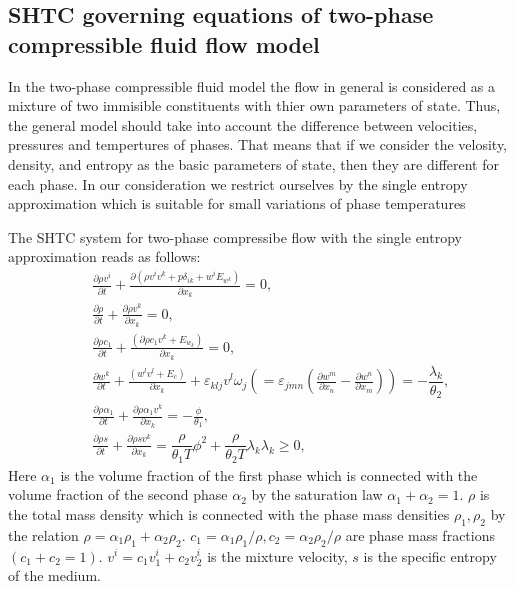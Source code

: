 \documentclass[3p,times]{elsarticle}
\begin{document}
\subsection{SHTC governing equations of two-phase compressible fluid flow model}

In the two-phase compressible fluid model the flow in general is considered as a mixture of two immisible constituents with thier own parameters of state. Thus, the general model should take into account the difference between velocities, pressures and tempertures of phases. That means that if we consider the velosity, density, and entropy as the basic parameters of state, then they are different for each phase. In our consideration we restrict ourselves by the single entropy approximation which is suitable for small variations of phase temperatures \cite{Romenski2015}  

The SHTC system for two-phase compressibe flow with the single entropy approximation \cite{Romenski2010} reads as follows:
\begin{eqnarray}\label{eqn.HPRFF}
&&\displaystyle\frac{\partial \rho v^i}{\partial t}+\frac{\partial 
	(\rho v^i v^k + p \delta_{ik} + w^iE_{w^k} )}{\partial x_k}=0, 
\label{eqn.momentumFF}\\[2mm]
&& \frac{\partial \rho}{\partial t}+\frac{\partial \rho v^k}{\partial 
	x_k}=0,\label{eqn.contiFF}\\[2mm]
&& \frac{\partial \rho c_1}{\partial t}+\frac{(\partial \rho c_1 v^k+E_{w_k})}{\partial 
	x_k}=0,\label{eqn.contiFF}\\[2mm]
&&\displaystyle\frac{\partial w^k}{\partial t}+\frac{(w^lv^l+E_c)}{\partial x_k}+\varepsilon_{klj}v^l\omega_j (=\varepsilon_{jmn}\left(\frac{\partial w^m}{\partial x_n}-\frac{\partial w^n}{\partial x_m}\right))=-\dfrac{ \lambda_{k} }{\theta_2},\label{eqn.relvel}\\[2mm]
&& \frac{\partial \rho \alpha_1}{\partial t}+\frac{\partial \rho \alpha_1 v^k }{\partial 
	x_k}=-\frac{\phi}{\theta_1},\label{eqn.alphaFF}\\[2mm]
&&\displaystyle\frac{\partial \rho s}{\partial t}+\frac{\partial \rho 
	s v^k }{\partial x_k}=\dfrac{\rho}{\theta_1 T}\phi^2 +
\dfrac{\rho}{\theta_2 T}\lambda_k \lambda_k \geq0, 
\label{eqn.entropyFF}
\end{eqnarray}
Here $\alpha_1$ is the volume fraction of the first phase which is connected with the volume 
fraction of the second phase $\alpha_2$ by the saturation law $\alpha_1+\alpha_2=1$. $\rho$ is the total mass density which is connected with the phase mass densities $\rho_1,\rho_2$ by the relation $\rho=\alpha_1\rho_1+\alpha_2\rho_2$. $c_1=\alpha_1 \rho_1/\rho, c_2=\alpha_2 \rho_2/\rho$ are phase mass fractions $(c_1+c_2=1)$. $v^i=c_1v_1^i+c_2v_2^i$ is the mixture velocity, $s$ is the specific entropy of the medium.
\end{document}
